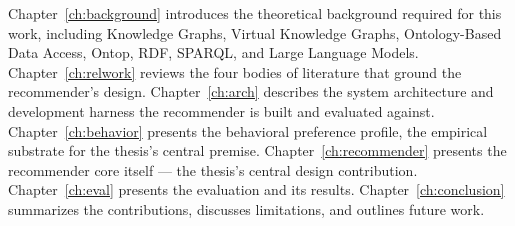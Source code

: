 Chapter~\ref{ch:background} introduces the theoretical background required for this work, including
Knowledge Graphs, Virtual Knowledge Graphs, Ontology-Based Data Access, Ontop, RDF, SPARQL, and
Large Language Models. Chapter~\ref{ch:relwork} reviews the four bodies of literature that ground
the recommender's design. Chapter~\ref{ch:arch} describes the system architecture and development
harness the recommender is built and evaluated against. Chapter~\ref{ch:behavior} presents the
behavioral preference profile, the empirical substrate for the thesis's central premise.
Chapter~\ref{ch:recommender} presents the recommender core itself --- the thesis's central design
contribution. Chapter~\ref{ch:eval} presents the evaluation and its results.
Chapter~\ref{ch:conclusion} summarizes the contributions, discusses limitations, and outlines
future work.
